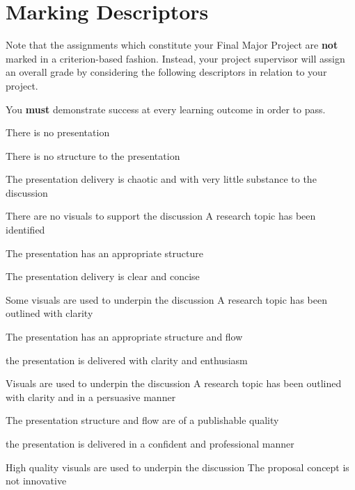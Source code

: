 \chapter{Marking Descriptors}

Note that the assignments which constitute your Final Major Project are \textbf{not} marked in a criterion-based fashion.
Instead, your project supervisor will assign an overall grade by considering the following descriptors in relation to your project.

You \textbf{must} demonstrate success at every learning outcome in order to pass.

\begin{markingrubric}
   
        \grade \fail 	There is no presentation
            \par 		There is no structure to the presentation
            \par        The presentation delivery is chaotic and with very little substance to the discussion   
            \par        There are no visuals to support the discussion
        \grade 		A research topic has been identified
            \par 	The presentation has an appropriate structure
            \par    The presentation delivery is clear and concise
            \par    Some visuals are used to underpin the discussion
        \grade		A research topic has been outlined with clarity
            \par 	The presentation has an appropriate structure and flow
            \par    the presentation is delivered with clarity and enthusiasm   
            \par    Visuals are used to underpin the discussion
        \grade		A research topic has been outlined with clarity and in a persuasive manner 
            \par 	The presentation structure and flow are of a publishable quality
            \par    the presentation is delivered in a confident and professional manner   
            \par    High quality visuals are used to underpin the discussion
        \grade\fail 	The proposal concept is not innovative

\end{markingrubric}
